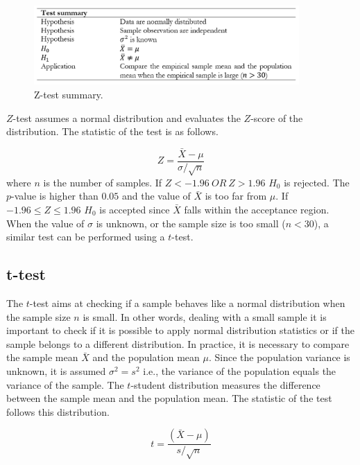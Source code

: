 \begin{figure}[hbt!]
\centering
\includegraphics[width=0.9\textwidth]{SectionLetsMath/elemStat_figures/tab_zTest.png}
\captionsetup{type=table}
\caption{Z-test summary.}
\label{tab_zTest}
\end{figure}

$Z$-test assumes a normal distribution and evaluates the $Z$-score of the distribution. The statistic of the test is as follows.

\begin{equation}
Z=\frac{\bar{X}-\mu}{\sigma/\sqrt n}
\label{eq_ztest}
\end{equation}
where $n$ is the number of samples. If $Z<-1.96\ OR\ Z>1.96$ $H_0$ is rejected. The $p$-value is higher than $0.05$ and the value of $\bar{X}$ is too far from $\mu$. If $-1.96\le Z\le1.96$ $H_0$ is accepted since $\bar{X}$ falls within the acceptance region. When the value of $\sigma$ is unknown, or the sample size is too small ($n<30$), a similar test can be performed using a $t$-test.

\subsection{t-test}
The $t$-test aims at checking if a sample behaves like a normal distribution when the sample size $n$ is small. In other words, dealing with a small sample it is important to check if it is possible to apply normal distribution statistics or if the sample belongs to a different distribution. In practice, it is necessary to compare the sample mean $\bar{X}$ and the population mean $\mu$. Since the population variance is unknown, it is assumed $\sigma^2=s^2$ i.e., the variance of the population equals the variance of the sample. The $t$-student distribution measures the difference between the sample mean and the population mean. The statistic of the test follows this distribution.

\begin{equation}
t=\frac{(\bar{X}-\mu)}{s/\sqrt n}
\label{eq_tTest}
\end{equation}

